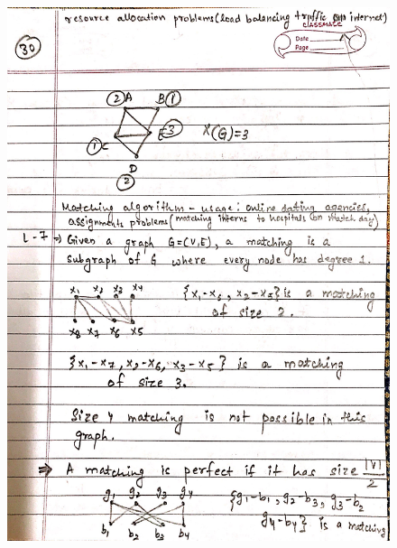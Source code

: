 \begin{figure}[H]
    \centering
    \includegraphics[width=16cm, height=21cm]{"./MIT-6.042J/MIT-6042J-030"}
\end{figure}
\newpage
